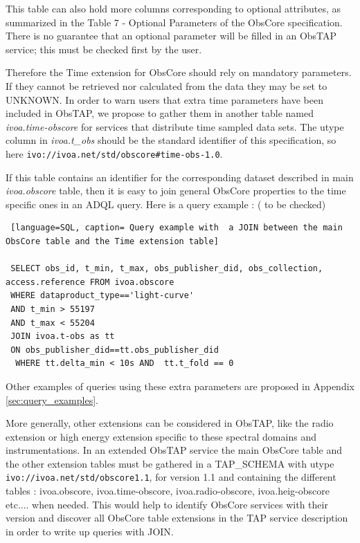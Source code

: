 \documentclass[11pt,a4paper]{ivoa}
\begin{document}
 This table can also hold more columns corresponding to  optional attributes, as summarized in the Table 7 - Optional Parameters  of the ObsCore specification.
 There is no guarantee that an optional parameter will be filled in an ObsTAP service; this must be checked first by the user.

 Therefore the Time extension for ObsCore should rely on mandatory parameters.
 If they cannot be retrieved nor calculated from the data they may be set to UNKNOWN.
 In order to warn users that extra time parameters have been included in ObsTAP, we propose to gather them  in another table named \emph{ivoa.time-obscore}
 for services that distribute time sampled data sets.
 The utype column in  \emph{ivoa.t\_obs} should be the standard identifier of this specification, so here \texttt{ivo://ivoa.net/std/obscore\#time-obs-1.0}.

 If this table contains an identifier for the corresponding dataset described in main \emph{ivoa.obscore} table, then it is easy to join  general ObsCore properties to the time specific ones in an ADQL query.
 Here is a query  example :  ( to be checked)
 \begin{lstlisting} [language=SQL, caption= Query example with  a JOIN between the main ObsCore table and the Time extension table]

 SELECT obs_id, t_min, t_max, obs_publisher_did, obs_collection, access.reference FROM ivoa.obscore
 WHERE dataproduct_type=='light-curve'
 AND t_min > 55197
 AND t_max < 55204
 JOIN ivoa.t-obs as tt
 ON obs_publisher_did==tt.obs_publisher_did
  WHERE tt.delta_min < 10s AND  tt.t_fold == 0
 \end{lstlisting}

Other examples of queries using these extra parameters are proposed in Appendix \ref{sec:query_examples}.

More generally, other extensions can be considered in ObsTAP, like the radio extension or high energy extension specific to these spectral domains and instrumentations.
In an extended ObsTAP service the main ObsCore table and the other extension tables must be gathered in a TAP\_SCHEMA with utype \\ \texttt{ivo://ivoa.net/std/obscore1.1}, for version 1.1 and containing the different tables : ivoa.obscore, ivoa.time-obscore, ivoa.radio-obscore, ivoa.heig-obscore etc.... when needed.
This would help to identify ObsCore services with their version and discover all ObsCore table extensions in the TAP service description in order to write up queries with JOIN. 
\end{document}
